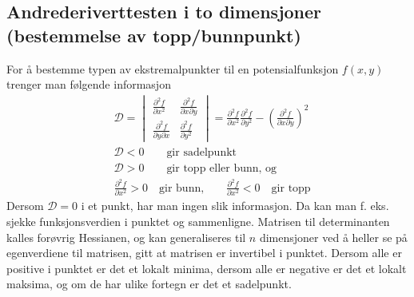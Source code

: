 \documentclass[fleqn,12pt]{wlscirep}
\begin{document}
\subsection{Andrederiverttesten i to dimensjoner (bestemmelse av topp/bunnpunkt)}
For å bestemme typen av ekstremalpunkter til en potensialfunksjon $f(x,y)$ trenger man følgende informasjon
\begin{align}
    &\mathcal{D} = 
    \begin{vmatrix}
    \frac{\partial^2 f}{\partial x ^2} & \frac{\partial^2 f }{\partial x \partial y}\\
    \frac{\partial^2 f}{\partial y \partial x} & \frac{\partial^2 f}{\partial y^2}
    \end{vmatrix} = \frac{\partial^2 f}{\partial x^2}\frac{\partial^2 f}{\partial y^2} - \left(\frac{\partial^2 f}{\partial x \partial y}\right)^{2}\\ &\mathcal{D} < 0 \qquad \text{gir sadelpunkt} \\ &\mathcal{D} > 0 \qquad\text{gir topp eller bunn, og}\\
    &\frac{\partial^2 f}{\partial x^2} > 0 \quad \text{gir bunn,} \qquad \frac{\partial^2 f}{\partial x^2} < 0\quad \text{gir topp}
\end{align}
Dersom $\mathcal{D} = 0$ i et punkt, har man ingen slik informasjon. Da kan man f. eks. sjekke funksjonsverdien i punktet og sammenligne. Matrisen til determinanten kalles forøvrig Hessianen, og kan generaliseres til $n$ dimensjoner ved å heller se på egenverdiene til matrisen, gitt at matrisen er invertibel i punktet. Dersom alle er positive i punktet er det et lokalt minima, dersom alle er negative er det et lokalt maksima, og om de har ulike fortegn er det et sadelpunkt.  
\end{document}
